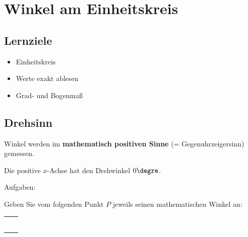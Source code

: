 
\section{Winkel am Einheitskreis}


\subsection*{Lernziele}

\begin{itemize}
\item Einheitskreis
\item Werte exakt ablesen
\item Grad- und Bogenmaß
\end{itemize}

\newpage
\subsection{Drehsinn}
Winkel werden im \textbf{mathematisch positiven Sinne} (=
Gegenuhrzeigersinn) gemessen.

Die positive $x$-Achse hat den Drehwinkel $0\degre$.

Aufgaben:

Geben Sie vom folgenden Punkt $P$ jeweils seinen mathematischen
Winkel an:


\begin{tabular}{cc}\makecell{
  $P=(1 | 1)\TRAINER{=45\degre}$\\
  \miniEinheitskreis{}} &

  \makecell{$P=(-1 | 1)\TRAINER{=135\degre}$\\
  \miniEinheitskreis{}} \\


   \makecell{ $P=(1 | {-1})\TRAINER{=315\degre = -45\degre}$\\
  \miniEinheitskreis{}} &

  \makecell{$P=(\sqrt{3} | {-1}) \TRAINER{330\degre = -30\degre}$\\
  \miniEinheitskreis{}} \\

\end{tabular}

\newpage


